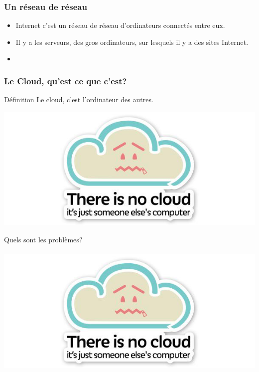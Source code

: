 \documentclass{beamer}
\begin{document}
\begin{frame}
\frametitle{Un réseau de réseau}
\begin{itemize}
\item Internet c'est un réseau de réseau d'ordinateurs connectés entre eux.
\item Il y a les serveurs, des gros ordinateurs, sur lesquels il y a des sites Internet.
\item 
\end{itemize}
\end{frame}
\begin{frame}
\frametitle{Le Cloud, qu'est ce que c'est?}
\begin{block}{Définition}
Le cloud, c'est l'ordinateur des autres.
\end{block}
\begin{center}
\includegraphics[scale=0.4]{./images/cloud.png}
\end{center}
\end{frame}
\begin{frame}
\begin{center}
\Huge{Quels sont les problèmes?}
\\~\\ \includegraphics[scale=0.4]{./images/cloud.png}
\end{center}
\end{frame}
\end{document}
